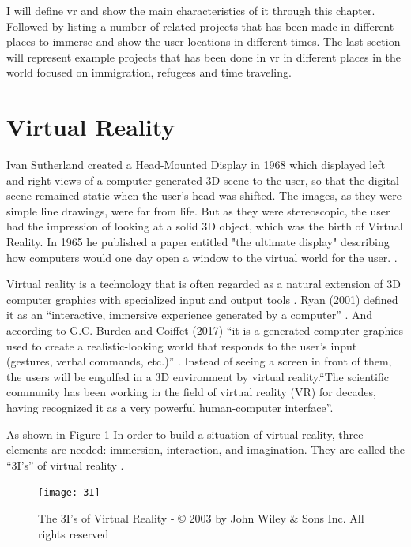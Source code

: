 I will define \acrfull{vr} and show the main characteristics of it through this chapter. Followed by listing a number of related projects that has been made in different places to immerse and show the user locations in different times. The last section will represent example projects that has been done in \acrshort{vr} in different places in the world focused on immigration, refugees and time traveling.   

\section{Virtual Reality}
Ivan Sutherland created a Head-Mounted Display in 1968 which displayed left and right views of a computer-generated 3D scene to the user, so that the digital scene remained static when the user's head was shifted. The images, as they were simple line drawings, were far from life. But as they were stereoscopic, the user had the impression of looking at a solid 3D object, which was the birth of Virtual Reality. In 1965 he published a paper entitled "the ultimate display" describing how computers would one day open a window to the virtual world for the user. \citep{Vince2011}.  

Virtual reality is a technology that is often regarded as a natural extension of 3D computer graphics with specialized input and output tools \citep{Jayaram1997}. Ryan (2001) defined it as an “interactive, immersive experience generated by a computer” \citep{Ryan2001}. And according to G.C. Burdea and Coiffet (2017) “it is a generated computer graphics used to create a realistic-looking world that responds to the user’s input (gestures, verbal commands, etc.)” \cite[p.20]{burdea2017virtual}. Instead of seeing a screen in front of them, the users will be engulfed in a 3D environment by virtual reality.“The scientific community has been working in the field of virtual reality (VR) for decades, having recognized it as a very powerful human-computer interface”\cite[p.19]{burdea2017virtual}. 

As shown in Figure \ref{fig:3I} In order to build a situation of virtual reality, three elements are needed:  immersion, interaction, and imagination. They are called the “3I’s” of virtual reality \citep{Hu2016,burdea2017virtual,Bamodu2013VirtualComponents}.

\begin{figure} %
    \centering
    \texttt{[image: 3I]}
    \caption{The 3I's of Virtual Reality - © 2003 by John Wiley \& Sons Inc. All rights
reserved}
    \label{fig:3I}
\end{figure}




